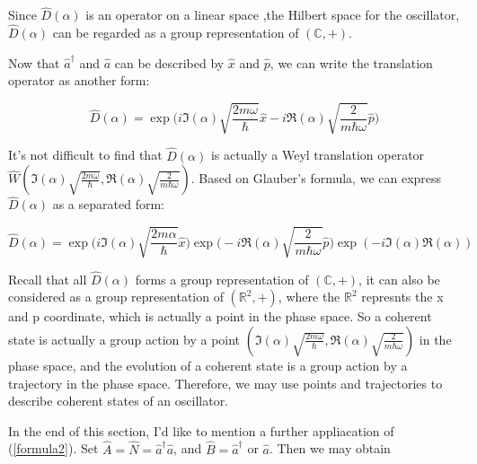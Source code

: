 \documentclass{article}
\begin{document}
        Since $\hat{D}(\alpha)$ is an operator on a linear space ,the Hilbert space for the oscillator, $\hat{D}(\alpha)$ can be regarded as a group representation of $(\mathbb{C}, +)$.

        \vbox{}

        \vbox{}

        Now that $\hat{a}^\dagger$ and $\hat{a}$ can be described by $\hat{x}$ and $\hat{p}$, we can write the translation operator as another form: 

        \begin{equation}\label{Weyl translation 1}
            \hat{D}(\alpha) = \exp\biggl(i\Im(\alpha)\sqrt{\frac{2m\omega}{\hbar}}\hat{x}-i\Re(\alpha)\sqrt{\frac{2}{m\hbar\omega}}\hat{p}\biggr)
        \end{equation}

        It's not difficult to find that $\hat{D}(\alpha)$ is actually a Weyl translation operator $\hat{W}(\Im(\alpha)\sqrt{\frac{2m\omega}{\hbar}}, \Re(\alpha)\sqrt{\frac{2}{m\hbar\omega}})$. Based on Glauber's formula, we can express $\hat{D}(\alpha)$ as a separated form:

        \begin{equation}\label{Weyl translation 2}
            \hat{D}(\alpha) = \exp\biggl(i\Im(\alpha)\sqrt{\frac{2m\alpha}{\hbar}}\hat{x}\biggr) \exp\biggl(-i\Re(\alpha)\sqrt{\frac{2}{m\hbar\omega}}\hat{p}\biggr) \exp(-i \Im(\alpha)\Re(\alpha))
        \end{equation}

        Recall that all $\hat{D}(\alpha)$ forms a group representation of $(\mathbb{C}, +)$, it can also be considered as a group representation of $(\mathbb{R}^2, +)$, where the $\mathbb{R}^2$ represnts the x and p coordinate, which is actually a point in the phase space. So a coherent state is actually a group action by a point $(\Im(\alpha)\sqrt{\frac{2m\omega}{\hbar}}, \Re(\alpha)\sqrt{\frac{2}{m\hbar\omega}})$ in the phase space, and the evolution of a coherent state is a group action by a trajectory in the phase space. Therefore, we may use points and trajectories to describe coherent states of an oscillator.

        \vbox{}

        \vbox{}

        In the end of this section, I'd like to mention a further appliacation of (\ref{formula2}). Set $\hat{A}=\hat{N}=\hat{a}^\dagger\hat{a}$, and $\hat{B}=\hat{a}^\dagger$ or $\hat{a}$. Then we may obtain
\end{document}

